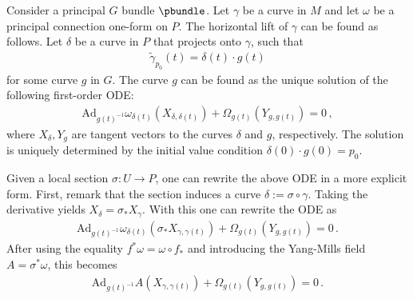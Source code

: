     \begin{method}
        Consider a principal $G$ bundle $\pbundle$. Let $\gamma$ be a curve in $M$ and let $\omega$ be a principal connection one-form on $P$. The horizontal lift of $\gamma$ can be found as follows. Let $\delta$ be a curve in $P$ that projects onto $\gamma$, such that
        \begin{gather}
            \widetilde\gamma_{p_0}(t)=\delta(t)\cdot g(t)
        \end{gather}
        for some curve $g$ in $G$. The curve $g$ can be found as the unique solution of the following first-order ODE:
        \begin{gather}
            \label{bundle:horizontal_ode}
            \mathrm{Ad}_{g(t)^{-1}}\omega_{\delta(t)}(X_{\delta,\delta(t)}) + \Omega_{g(t)}(Y_{g,g(t)}) = 0\,,
        \end{gather}
        where $X_\delta,Y_g$ are tangent vectors to the curves $\delta$ and $g$, respectively. The solution is uniquely determined by the initial value condition $\delta(0)\cdot g(0)=p_0$.
    \end{method}
    \begin{remark}
        Given a local section $\sigma:U\rightarrow P$, one can rewrite the above ODE in a more explicit form. First, remark that the section induces a curve $\delta:=\sigma\circ\gamma$. Taking the derivative yields $X_\delta=\sigma_*X_\gamma$. With this one can rewrite the ODE as
        \begin{gather}
            \mathrm{Ad}_{g(t)^{-1}}\omega_{\delta(t)}(\sigma_*X_{\gamma,\gamma(t)}) + \Omega_{g(t)}(Y_{g,g(t)}) = 0\,.
        \end{gather}
        After using the equality $f^*\omega=\omega\circ f_*$ and introducing the Yang-Mills field $A=\sigma^*\omega$, this becomes
        \begin{gather}
            \mathrm{Ad}_{g(t)^{-1}}A(X_{\gamma,\gamma(t)}) + \Omega_{g(t)}(Y_{g,g(t)}) = 0\,.
        \end{gather}
    \end{remark}

